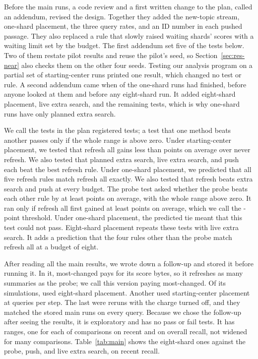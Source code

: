 Before the main runs, a code review and a first written change to the plan, called an addendum, revised the design.
Together they added the new-topic stream, one-shard placement, the three query rates, and an ID number in each pushed passage.
They also replaced a rule that slowly raised waiting shards' scores with a waiting limit set by the budget.
The first addendum set five of the tests below.
Two of them restate pilot results and reuse the pilot's seed, so Section~\ref{sec:res-near} also checks them on the other four seeds.
Testing our analysis program on a partial set of \RNumPartialMOneTestedRuns{} starting-center runs printed one result, which changed no test or rule.
A second addendum came when \RNumPlainAddTwoRunsDone{} of the \RNumPlainAddTwoRunsTotal{} one-shard runs had finished, before anyone looked at them and before any eight-shard run.
It added eight-shard placement, live extra search, and the remaining tests, which is why one-shard runs have only planned extra search.

We call the tests in the plan registered tests; a test that one method beats another passes only if the whole range is above zero.
Under starting-center placement, we tested that refresh all gains less than \RNumPlainGateThreshold{} points on average over never refresh.
We also tested that planned extra search, live extra search, and push each beat the best refresh rule.
Under one-shard placement, we predicted that all five refresh rules match refresh all exactly.
We also tested that refresh beats extra search and push at every budget.
The probe test asked whether the probe beats each other rule by at least \RNumPlainGateThreshold{} points on average, with the whole range above zero.
It ran only if refresh all first gained at least \RNumPlainGateThreshold{} points on average, which we call the \RNumPlainGateThreshold{}-point threshold.
Under one-shard placement, the predicted tie meant that this test could not pass.
Eight-shard placement repeats these tests with live extra search.
It adds a prediction that the four rules other than the probe match refresh all at a budget of eight.

After reading all the main results, we wrote down a follow-up and stored it before running it.
In it, most-changed pays for its score bytes, so it refreshes as many summaries as the probe; we call this version paying most-changed.
Of its \RNumAddThreeTotalRuns{} simulations, \RNumAddThreeMThreeRuns{} used eight-shard placement.
Another \RNumAddThreeMOneRuns{} used starting-center placement at \RNumPlainQueriesHigh{} queries per step.
The last \RNumAddThreeRepRuns{} were reruns with the charge turned off, and they matched the stored main runs on every query.
Because we chose the follow-up after seeing the results, it is exploratory and has no pass or fail tests.
It has \RNumAddThreeTotalIntervals{} ranges, one for each of \RNumAddThreeCompRows{} comparisons on recent and on overall recall, not widened for many comparisons.
Table~\ref{tab:main} shows the eight-shard ones against the probe, push, and live extra search, on recent recall.

